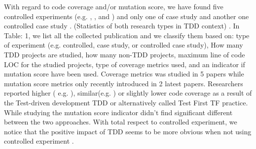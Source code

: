\documentclass[conference]{IEEEtran}
\begin{document}
With regard to code coverage and/or mutation score, we have found five controlled experiments (e.g. \cite{george2004structured}, \cite{madeyski2010impact}, and \cite{panvcur2011impact}) and only one of case study \cite{bhat2006evaluating} and another one controlled case study \cite{siniaalto2007comparative}. (Statistics of both research types in TDD context) . In Table: 1, we list all the collected publication and we classify them based on: type of experiment (e.g. controlled, case study, or controlled case study), How many TDD projects are studied, how many non-TDD projects, maximum line of code LOC for the studied projects, type of coverage metrics used, and an indicator if mutation score have been used. Coverage metrics was studied in 5 papers while mutation score metrics only recently introduced in 2 latest papers. Researchers reported higher ( e.g.\cite{siniaalto2007comparative} \cite{bhat2006evaluating}), similar(e.g. \cite{madeyski2010impact}) or slightly lower \cite{geras2004prototype} code coverage as a result of the Test-driven development TDD or alternatively called Test First TF practice.  While studying the mutation score indicator didn’t find significant different between the two approaches. With total respect to controlled experiment, we notice that the positive impact of TDD seems to be more obvious when not using controlled experiment \cite{bhat2006evaluating} \cite{siniaalto2007comparative}. 
\end{document}
